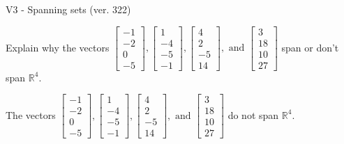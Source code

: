 \begin{exercise}
  \begin{exerciseTitle}V3 - Spanning sets (ver. 322)\end{exerciseTitle}
  \begin{exerciseStatement}
    Explain why the vectors \(\left[\begin{array}{r}
-1 \\
-2 \\
0 \\
-5
\end{array}\right] , \left[\begin{array}{r}
1 \\
-4 \\
-5 \\
-1
\end{array}\right] , \left[\begin{array}{r}
4 \\
2 \\
-5 \\
14
\end{array}\right] , \text{ and } \left[\begin{array}{r}
3 \\
18 \\
10 \\
27
\end{array}\right]\) span or don't span \(\mathbb{R}^4\). 
	


  \end{exerciseStatement}
  \begin{exerciseAnswer}
   The vectors \(\left[\begin{array}{r}
-1 \\
-2 \\
0 \\
-5
\end{array}\right] , \left[\begin{array}{r}
1 \\
-4 \\
-5 \\
-1
\end{array}\right] , \left[\begin{array}{r}
4 \\
2 \\
-5 \\
14
\end{array}\right] , \text{ and } \left[\begin{array}{r}
3 \\
18 \\
10 \\
27
\end{array}\right]\) 
  	 do not  
	span \(\mathbb{R}^4\).
  


  \end{exerciseAnswer}
\end{exercise}